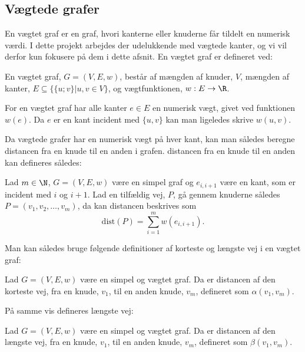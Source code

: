 \subsection{Vægtede grafer}
En vægtet graf er en graf, hvori kanterne eller knuderne får tildelt en numerisk værdi. I dette projekt arbejdes der udelukkende med vægtede kanter, og vi vil derfor kun fokusere på dem i dette afsnit.
En vægtet graf er defineret ved:
\begin{defn}
En vægtet graf, $G=(V,E,w)$, består af mængden af knuder, $V$, mængden af kanter, $E \subseteq \{\{u;v\}|u,v \in V\}$, og vægtfunktionen, $w: E \rightarrow \R$.
\end{defn}


For en vægtet graf har alle kanter $e\in E$ en numerisk vægt, givet ved funktionen $w (e)$. Da $e$ er en kant incident med $\{u,v\}$ kan man  ligeledes skrive $w (u,v)$.


Da vægtede grafer har en numerisk vægt på hver kant, kan man således beregne distancen fra en knude til en anden i grafen. distancen fra en knude til en anden kan defineres således:

\begin{defn}[Distance]
Lad $m\in \N $, $G=(V,E,w)$ være en simpel graf og  $e_{i,i+1}$ være en kant, som er incident med $i$ og $i+1$. Lad en tilfældig vej, $P$, gå gennem knuderne således $P=(v_1,v_2,\dotsc,v_m)$, da kan distancen beskrives som
	\begin{equation*}
	\mathrm{dist}(P)=\sum_{i=1}^{m}w(e_{i,i+1}).
	\end{equation*}  
\end{defn}

Man kan således bruge følgende definitioner af korteste og længste vej i en vægtet graf:


\begin{defn} \label{defn:min.vej}
Lad $G=(V,E,w)$ være en simpel og vægtet graf. Da er distancen af den korteste vej, fra en knude, $v_1$, til en anden knude, $v_m$, defineret som $\alpha(v_1,v_m)$.
\end{defn}

På samme vis defineres længste vej:

\begin{defn} 
Lad $G=(V,E,w)$ være en simpel og vægtet graf. Da er distancen af den længste vej, fra en knude, $v_1$, til en anden knude, $v_m$, defineret som $\beta(v_1,v_m)$.
\end{defn}

